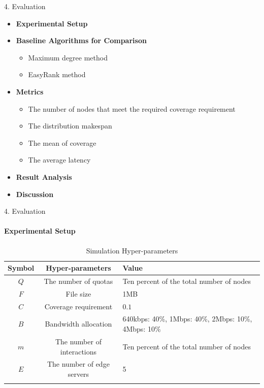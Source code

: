 \documentclass{beamer}		%
\begin{document}
\begin{frame}{4. Evaluation}
\begin{itemize}
    \item \textbf{Experimental Setup}
    \item \textbf{Baseline Algorithms for Comparison}
    \begin{itemize}
        \item Maximum degree method
        \item EasyRank method
    \end{itemize}
    \item \textbf{Metrics}
    \begin{itemize}
        \item The number of nodes that meet the required coverage requirement
        \item The distribution makespan
        \item The mean of coverage
        \item The average latency
    \end{itemize}
    \item \textbf{Result Analysis}
    \item \textbf{Discussion}
\end{itemize}
\end{frame}

\begin{frame}{4. Evaluation}
\framesubtitle{Experimental Setup}
\centering
\begin{table}[]
    \centering
    \begin{tabularx}{\textwidth}{c|c|Y}
    \Xhline{1.5pt}
     \textbf{Symbol} & \textbf{Hyper-parameters} & \textbf{Value} \\
     \hline \hline
     $Q$ & The number of quotas & Ten percent of the total number of nodes \\
     \hline
     $F$ & File size & 1MB \\
     \hline
     $C$ & Coverage requirement & $0.1$\\
     \hline
     $B$ & Bandwidth allocation & 640kbps: 40\%, 1Mbps: 40\%, 2Mbps: 10\%, 4Mbps: 10\% \\
     \hline
     $m$ & The number of interactions & Ten percent of the total number of nodes \\
     \hline
     $E$ & The number of edge servers & 5\\
\Xhline{1.5pt}     
\end{tabularx}
\caption{Simulation Hyper-parameters}
\label{tab:my_label}
\end{table}
\end{frame}
\end{document}
